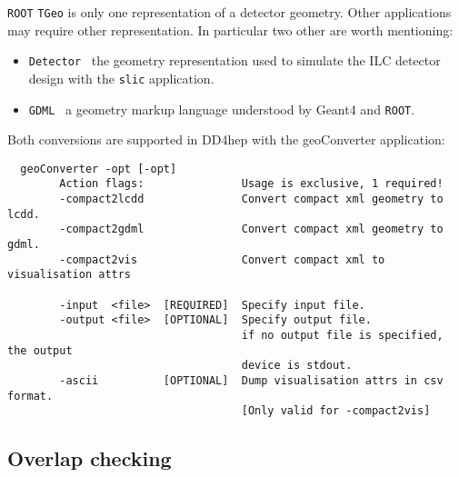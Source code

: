 \texttt{ROOT} \texttt{TGeo} is only one representation of a detector geometry. Other applications may require other representation. In particular two other are worth mentioning:
\begin{itemize}
\item \texttt{Detector}~\cite{Gaede:81331} the geometry representation used to simulate the ILC detector design with the \texttt{slic} application.
\item \texttt{GDML}~\cite{Chytracek:2006be} a geometry markup language understood by Geant4 and \texttt{ROOT}.
\end{itemize}
Both conversions are supported in DD4hep with the geoConverter application:
\begin{verbatim}
  geoConverter -opt [-opt]                                                
        Action flags:               Usage is exclusive, 1 required!           
        -compact2lcdd               Convert compact xml geometry to lcdd.     
        -compact2gdml               Convert compact xml geometry to gdml.     
        -compact2vis                Convert compact xml to visualisation attrs

        -input  <file>  [REQUIRED]  Specify input file.                       
        -output <file>  [OPTIONAL]  Specify output file.                      
                                    if no output file is specified, the output
                                    device is stdout.                         
        -ascii          [OPTIONAL]  Dump visualisation attrs in csv format.   
                                    [Only valid for -compact2vis]             
\end{verbatim}

\subsection{Overlap checking}
\label{sec:dd4hep-manual-overlap-checking}

